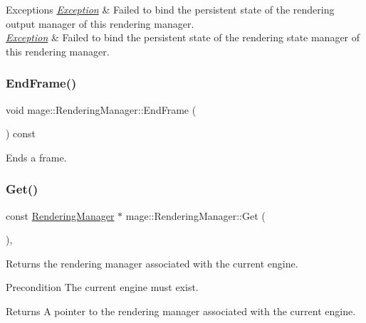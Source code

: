 \begin{DoxyExceptions}{Exceptions}
{\em \hyperlink{classmage_1_1_exception}{Exception}} & Failed to bind the persistent state of the rendering output manager of this rendering manager. \\
\hline
{\em \hyperlink{classmage_1_1_exception}{Exception}} & Failed to bind the persistent state of the rendering state manager of this rendering manager. \\
\hline
\end{DoxyExceptions}
\hypertarget{classmage_1_1_rendering_manager_ab4aee54db3d5249e0cc0848383b80dab}{}\label{classmage_1_1_rendering_manager_ab4aee54db3d5249e0cc0848383b80dab} 
\subsubsection{\texorpdfstring{End\+Frame()}{EndFrame()}}
{\footnotesize\ttfamily void mage\+::\+Rendering\+Manager\+::\+End\+Frame (\begin{DoxyParamCaption}{ }\end{DoxyParamCaption}) const}

Ends a frame. \hypertarget{classmage_1_1_rendering_manager_a920fdd741d160b687ecac1d892f8bfd1}{}\label{classmage_1_1_rendering_manager_a920fdd741d160b687ecac1d892f8bfd1} 
\subsubsection{\texorpdfstring{Get()}{Get()}}
{\footnotesize\ttfamily const \hyperlink{classmage_1_1_rendering_manager}{Rendering\+Manager} $\ast$ mage\+::\+Rendering\+Manager\+::\+Get (\begin{DoxyParamCaption}{ }\end{DoxyParamCaption})\hspace{0.3cm}{\ttfamily [static]}, {\ttfamily [noexcept]}}

Returns the rendering manager associated with the current engine.

\begin{DoxyPrecond}{Precondition}
The current engine must exist. 
\end{DoxyPrecond}
\begin{DoxyReturn}{Returns}
A pointer to the rendering manager associated with the current engine. 
\end{DoxyReturn}
\hypertarget{classmage_1_1_rendering_manager_a92dc62ffd2e86652edd86739ff878ac2}{}\label{classmage_1_1_rendering_manager_a92dc62ffd2e86652edd86739ff878ac2} 
